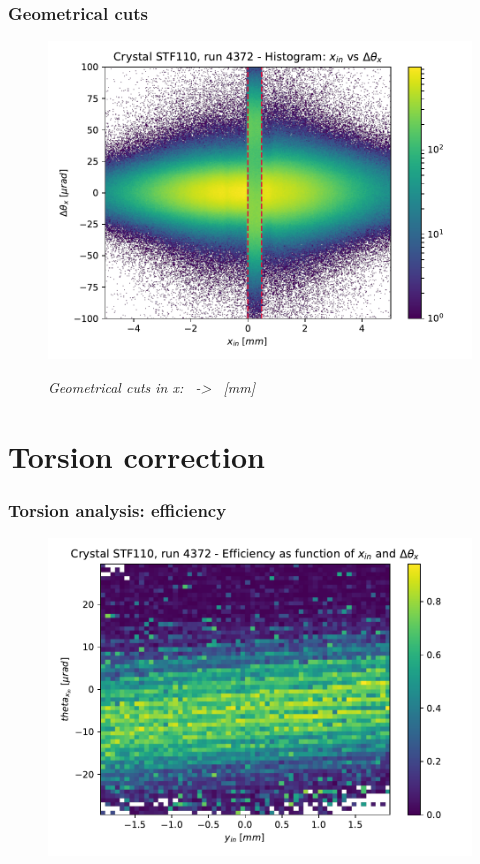 \documentclass[10pt]{beamer}
\begin{document}
\begin{frame}
\frametitle{Geometrical cuts}

\begin{figure}
\includegraphics[width=0.8\linewidth]{geocuts.pdf}\\
\caption{\footnotesize \itshape Geometrical cuts in x: \xmin\ -> \xmax\ [mm]}
\end{figure}

\end{frame}










\section{Torsion correction}



\begin{frame}
\frametitle{Torsion analysis: efficiency}

\begin{figure}
\includegraphics[width=0.8\linewidth]{efficiency_histo.pdf}\\
\end{figure}

\end{frame}
\end{document}
